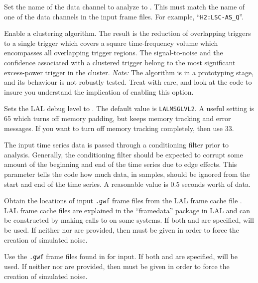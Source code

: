 \begin{entry}
\begin{entry}
\item[\option{--channel-name} \parm{string}]
Set the name of the data channel to analyze to .  This must
match the name of one of the data channels in the input frame files.  For
example, ``\verb|H2:LSC-AS_Q|''.

\item[\option{--cluster}]
Enable a clustering algorithm.  The result is the reduction of overlapping
triggers to a single trigger which covers a square time-frequency volume
which encompasses all overlapping trigger regions.   The signal-to-noise
and the confidence associated with a clustered trigger belong to the most
significant excess-power trigger in the cluster.  \emph{Note:}  The
algorithm is in a prototyping stage, and its behaviour is not robustly
tested.  Treat with care, and look at the code to insure you understand the
implication of enabling this option.

\item[\option{--debug-level} \parm{level}]
Sets the LAL debug level to .  The default value is
\texttt{LALMSGLVL2}.  A useful setting is 65 which turns off memory
padding, but keeps memory tracking and error messages.  If you want to turn
off memory tracking completely, then use 33.

\item[\option{--filter-corruption} \parm{samples}]
The input time series data is passed through a conditioning filter prior to
analysis.  Generally, the conditioning filter should be expected to corrupt
some amount of the beginning and end of the time series due to edge
effects.  This parameter tells the code how much data, in samples, should
be ignored from the start and end of the time series.  A reasonable value
is 0.5 seconds worth of data.

\item[\option{--frame-cache} \parm{cache file}]
Obtain the locations of input \texttt{.gwf} frame files from the LAL frame
cache file .  LAL frame cache files are explained in the
``framedata'' package in LAL and can be constructed by making calls to
 on some systems.  If both  and
 are specified,  will be used.  If
neither  nor  are provided, then
 must be given in order to force the creation of
simulated noise.

\item[\option{--frame-dir} \parm{directory}]
Use the \texttt{.gwf} frame files found in  for input.  If
both  and  are specified,
 will be used.  If neither  nor
 are provided, then  must be
given in order to force the creation of simulated noise.


\end{entry}
\end{entry}
